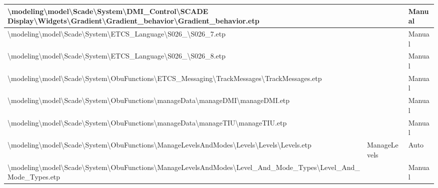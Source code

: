 \begin{longtable}{|>{\RaggedRight}p{}|>{\RaggedRight}p{}|>{\RaggedRight}p{}|}
\hline
\textbackslash \allowbreak modeling\textbackslash \allowbreak model\textbackslash \allowbreak Scade\textbackslash \allowbreak System\textbackslash \allowbreak DMI\_\allowbreak Control\textbackslash \allowbreak SCADE Display\textbackslash \allowbreak Widgets\textbackslash \allowbreak Gradient\textbackslash \allowbreak Gradient\_\allowbreak behavior\textbackslash \allowbreak Gradient\_\allowbreak behavior.etp& &Manual\\
\hline
\textbackslash \allowbreak modeling\textbackslash \allowbreak model\textbackslash \allowbreak Scade\textbackslash \allowbreak System\textbackslash \allowbreak ETCS\_\allowbreak Language\textbackslash \allowbreak S026\_\allowbreak 7\textbackslash \allowbreak S026\_\allowbreak 7.etp& &Manual\\
\hline
\textbackslash \allowbreak modeling\textbackslash \allowbreak model\textbackslash \allowbreak Scade\textbackslash \allowbreak System\textbackslash \allowbreak ETCS\_\allowbreak Language\textbackslash \allowbreak S026\_\allowbreak 8\textbackslash \allowbreak S026\_\allowbreak 8.etp& &Manual\\
\hline
\textbackslash \allowbreak modeling\textbackslash \allowbreak model\textbackslash \allowbreak Scade\textbackslash \allowbreak System\textbackslash \allowbreak ObuFunctions\textbackslash \allowbreak ETCS\_\allowbreak Messaging\textbackslash \allowbreak TrackMessages\textbackslash \allowbreak TrackMessages.etp& &Manual\\
\hline
\textbackslash \allowbreak modeling\textbackslash \allowbreak model\textbackslash \allowbreak Scade\textbackslash \allowbreak System\textbackslash \allowbreak ObuFunctions\textbackslash \allowbreak manageData\textbackslash \allowbreak manageDMI\textbackslash \allowbreak manageDMI.etp& &Manual\\
\hline
\textbackslash \allowbreak modeling\textbackslash \allowbreak model\textbackslash \allowbreak Scade\textbackslash \allowbreak System\textbackslash \allowbreak ObuFunctions\textbackslash \allowbreak manageData\textbackslash \allowbreak manageTIU\textbackslash \allowbreak manageTIU.etp& &Manual\\
\hline
\textbackslash \allowbreak modeling\textbackslash \allowbreak model\textbackslash \allowbreak Scade\textbackslash \allowbreak System\textbackslash \allowbreak ObuFunctions\textbackslash \allowbreak ManageLevelsAndModes\textbackslash \allowbreak Levels\textbackslash \allowbreak Levels\textbackslash \allowbreak Levels.etp&ManageLevels&Auto\\
\hline
\textbackslash \allowbreak modeling\textbackslash \allowbreak model\textbackslash \allowbreak Scade\textbackslash \allowbreak System\textbackslash \allowbreak ObuFunctions\textbackslash \allowbreak ManageLevelsAndModes\textbackslash \allowbreak Level\_\allowbreak And\_\allowbreak Mode\_\allowbreak Types\textbackslash \allowbreak Level\_\allowbreak And\_\allowbreak Mode\_\allowbreak Types.etp& &Manual\\

\end{longtable}
